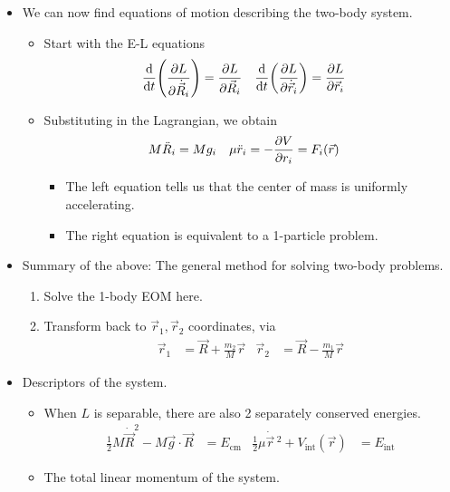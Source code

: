 \documentclass[../notes.tex]{subfiles}
\begin{document}
\begin{itemize}
\begin{itemize}
    \end{itemize}
    \item We can now find equations of motion describing the two-body system.
    \begin{itemize}
        \item Start with the E-L equations
        \begin{align*}
            \dv{t}(\pdv{L}{\dot{\vec{R}}_i}) &= \pdv{L}{\vec{R}_i}&
            \dv{t}(\pdv{L}{\dot{\vec{r}}_i}) &= \pdv{L}{\vec{r}_i}
        \end{align*}
        \item Substituting in the Lagrangian, we obtain
        \begin{align*}
            M\ddot{R}_i &= Mg_i&
            \mu\ddot{r}_i &= -\pdv{V}{r_i} = F_i(\vec{r})
        \end{align*}
        \begin{itemize}
            \item The left equation tells us that the center of mass is uniformly accelerating.
            \item The right equation is equivalent to a 1-particle problem.
        \end{itemize}
    \end{itemize}
    \item Summary of the above: The general method for solving two-body problems.
    \begin{enumerate}
        \item Solve the 1-body EOM here.
        \item Transform back to $\vec{r}_1,\vec{r}_2$ coordinates, via
        \begin{align*}
            \vec{r}_1 &= \vec{R}+\frac{m_2}{M}\vec{r}&
            \vec{r}_2 &= \vec{R}-\frac{m_1}{M}\vec{r}
        \end{align*}
    \end{enumerate}
    \item Descriptors of the system.
    \begin{itemize}
        \item When $L$ is separable, there are also 2 separately conserved energies.
        \begin{align*}
            \frac{1}{2}M\dot{\vec{R}}^2-M\vec{g}\cdot\vec{R} &= E_\text{cm}&
            \frac{1}{2}\mu\dot{\vec{r}}{\,}^2+V_\text{int}(\vec{r}) &= E_\text{int}
        \end{align*}
        \item The total linear momentum of the system.

\end{itemize}
\end{itemize}
\end{document}

